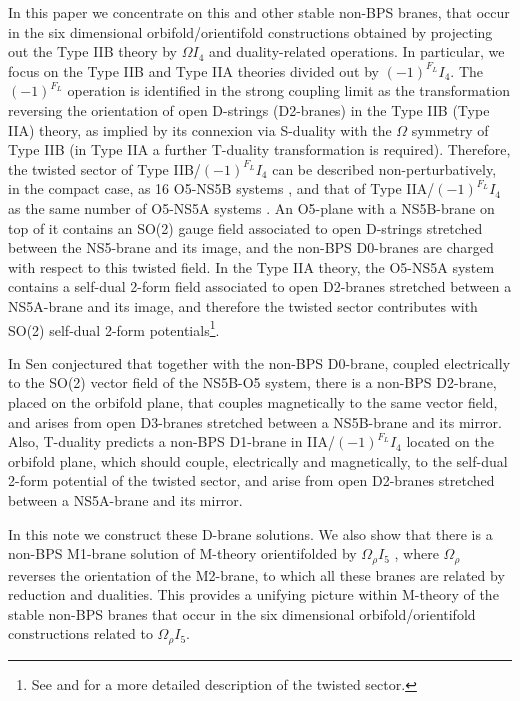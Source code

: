 \documentclass[12pt,a4paper]{article}
\begin{document}
In this paper we concentrate on this and other stable non-BPS
branes, that occur in the six dimensional orbifold/orientifold
constructions obtained by projecting out the Type IIB theory
by $\Omega I_4$ and duality-related operations. In particular,
we focus on the Type IIB and Type IIA theories divided out by
$(-1)^{F_L}I_4$. The $(-1)^{F_L}$ operation is identified in the
strong coupling limit as the transformation reversing the orientation
of open D-strings (D2-branes) in the Type IIB (Type IIA) theory,
as implied by its connexion via S-duality 
with the $\Omega$ symmetry of Type IIB \cite{Sen**}
(in Type IIA a further T-duality transformation is required).
Therefore, the twisted sector of Type IIB/$(-1)^{F_L}I_4$ 
can be described non-perturbatively, in the compact case, as
16 O5-NS5B systems \cite{Kuta,MS}, and that of Type IIA/$(-1)^{F_L}I_4$
as the same number of O5-NS5A systems \cite{Kuta}. 
An O5-plane with a NS5B-brane on top of it contains an SO(2)
gauge field associated to open D-strings stretched between the 
NS5-brane and its image,
and the non-BPS D0-branes are charged with respect to this twisted
field. In the Type IIA theory, the O5-NS5A system contains a
self-dual 2-form field associated to open D2-branes stretched between
a NS5A-brane and its image, 
and therefore the twisted sector contributes with 
SO(2) self-dual 2-form potentials\footnote{See \cite{Kuta} and
\cite{DM,W} for a more detailed description of the twisted sector.}.

In \cite{Senrev} Sen conjectured that together with the non-BPS D0-brane, 
coupled electrically
to the SO(2) vector field of the NS5B-O5 system, there is 
a non-BPS D2-brane, placed on the orbifold plane, that couples 
magnetically to the same vector field,
and arises from open D3-branes stretched between a NS5B-brane and
its mirror.
Also, T-duality predicts a non-BPS D1-brane in  
IIA/$(-1)^{F_L}I_4$ located on the orbifold plane, which should couple,
electrically and magnetically, to the self-dual 2-form potential of
the twisted sector, and arise from open D2-branes stretched between
a NS5A-brane and its mirror.

In this note we construct these D-brane solutions. We also show that
there is a non-BPS M1-brane solution of M-theory orientifolded by
$\Omega_\rho I_5$ \cite{DM,W},
where $\Omega_\rho$ reverses the orientation of 
the M2-brane, to which all these branes are related by reduction
and dualities. This provides a unifying picture within M-theory
of the stable non-BPS branes that occur in the six dimensional
orbifold/orientifold constructions related to $\Omega_\rho I_5$. 
\end{document}
